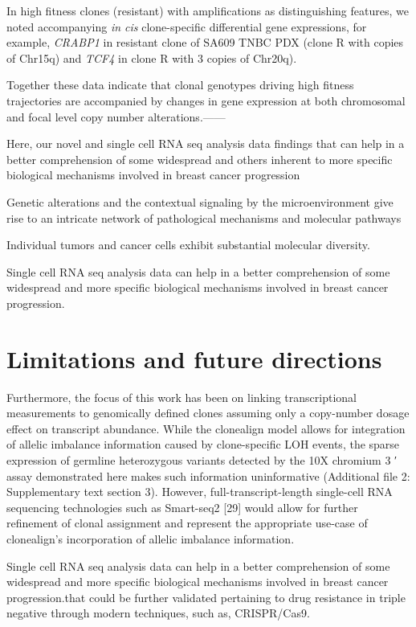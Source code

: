  


In high fitness clones (resistant) with amplifications as distinguishing features, we noted accompanying \textit{in cis} clone-specific differential gene expressions, for example, \textit{CRABP1} in resistant clone of SA609 TNBC PDX (clone R with copies of Chr15q) and  \textit{TCF4} in clone R with 3 copies of Chr20q).


Together these data indicate that clonal genotypes driving high fitness trajectories are accompanied by changes in gene expression at both chromosomal and focal level copy number alterations.------









Here, our novel  and single cell RNA seq analysis data findings that can help in a better comprehension of some widespread and others inherent to more specific biological mechanisms involved in breast cancer progression 


Genetic alterations and the contextual signaling by the microenvironment give rise to an intricate network of pathological mechanisms and molecular pathways


Individual tumors and cancer cells exhibit substantial molecular diversity.

Single cell RNA seq analysis data can help in a better comprehension of some widespread and more specific biological mechanisms involved in breast cancer progression.


\section{Limitations and future directions}

 Furthermore, the focus of this work has been on linking transcriptional measurements to genomically defined clones assuming only a copy-number dosage effect on transcript abundance. While the clonealign model allows for integration of allelic imbalance information caused by clone-specific LOH events, the sparse expression of germline heterozygous variants detected by the 10X chromium 3 ′ assay demonstrated here makes such information uninformative (Additional file 2: Supplementary text section 3). However, full-transcript-length single-cell RNA sequencing technologies such as Smart-seq2 [29] would allow for further refinement of clonal assignment and represent the appropriate use-case of clonealign’s incorporation of allelic imbalance information.
 
 
 
 
 
 
 Single cell RNA seq analysis data can help in a better comprehension of some widespread and more specific biological mechanisms involved in breast cancer progression.that could be further validated pertaining to drug resistance in triple negative through modern techniques, such as, CRISPR/Cas9.

